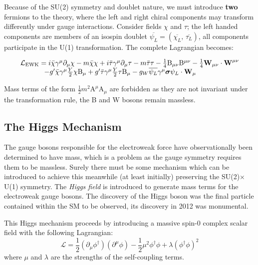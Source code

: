 Because of the SU(2) symmetry and doublet nature, we must introduce \textbf{two} fermions to the theory, where the left and right chiral components may transform differently under gauge interactions. Consider fields  $\chi$ and  $\tau$; the left handed components are members of an isospin doublet $\overline{\psi_{L}}=(\overline{\chi_{L}},\,\overline{\tau_{L}})$, all components participate in the U(1) transformation. The complete Lagrangian becomes:

\begin{equation}
\begin{array}{l}
\mathcal{L}_{\mathrm{EWK}} = 
i \bar{\chi} \gamma^{\mu} \partial_{\mu} \chi - m \bar{\chi} \chi
+ i \bar{\tau}   \gamma^{\mu}    \partial_{\mu} \tau  - m \bar{\tau} \tau
- \frac{1}{4}\mathrm{B}_{\mu\nu}\mathrm{B}^{\mu\nu}
-\frac{1}{4}\bm{\mathrm{W}}_{\mu\nu} \cdot \bm{\mathrm{W}}^{\mu\nu} \\
\hspace{1.2cm}
-  g' \bar{\chi} \gamma^{\mu} \frac{Y}{2} \chi \mathrm{B}_{\mu} + g' \bar{\tau} \gamma^{\mu} \frac{Y}{2} \tau \mathrm{B}_{\mu}
- g_W  \overline{\psi_{L}} \gamma^{\mu} \bm{\sigma} \psi_{L} \cdot \bm{\mathrm{W}}_{\mu}
\end{array}
\end{equation}

Mass terms of the form $\frac{1}{2}m^{2}\mathrm{A}^{\mu}\mathrm{A}_{\mu}$ are forbidden as they are not invariant under the transformation rule, the B and $\bm{\mathrm{W}}$ bosons remain massless.

\subsection{The Higgs Mechanism}

The gauge bosons responsible for the electroweak force have observationally been determined to have mass, which is a problem as the gauge symmetry requires them to be massless. Surely there must be some mechanism which can be introduced to achieve this meanwhile (at least initially) preserving the SU(2)$\times$U(1) symmetry. The \textit{Higgs field} is introduced to generate mass terms for the electroweak gauge bosons. The discovery of the Higgs boson was the final particle contained within the SM to be observed, its discovery in 2012 was monumental.\cite{higgsdisc}

This Higgs mechanism proceeds by introducing a massive spin-0 complex scalar field with the following Lagrangian:
\begin{equation}
\label{higgslag}
\mathcal{L} = \frac{1}{2} (\partial_{\mu}\phi^{\dagger})(\partial^{\mu}\phi) - \frac{1}{2}\mu^{2} \phi^{\dagger}\phi + \lambda(\phi^{\dagger}\phi)^{2}
\end{equation}
where $\mu$ and $\lambda$ are the strengths of the self-coupling terms.

